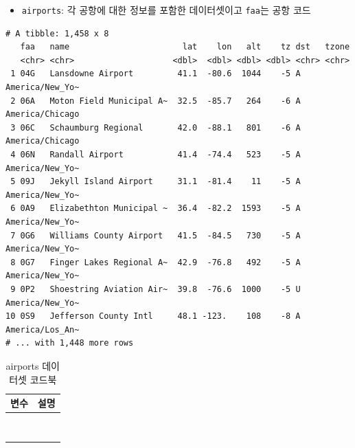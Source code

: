 \documentclass[
  11pt,
]{krantz}
\providecommand{\tightlist}{%
  \setlength{\itemsep}{0pt}\setlength{\parskip}{0pt}}
\begin{document}
\normalsize

\begin{itemize}
\tightlist
\item
  \texttt{airports}: 각 공항에 대한 정보를 포함한 데이터셋이고 \texttt{faa}는 공항 코드
\end{itemize}

\footnotesize

\begin{verbatim}
# A tibble: 1,458 x 8
   faa   name                       lat    lon   alt    tz dst   tzone          
   <chr> <chr>                    <dbl>  <dbl> <dbl> <dbl> <chr> <chr>          
 1 04G   Lansdowne Airport         41.1  -80.6  1044    -5 A     America/New_Yo~
 2 06A   Moton Field Municipal A~  32.5  -85.7   264    -6 A     America/Chicago
 3 06C   Schaumburg Regional       42.0  -88.1   801    -6 A     America/Chicago
 4 06N   Randall Airport           41.4  -74.4   523    -5 A     America/New_Yo~
 5 09J   Jekyll Island Airport     31.1  -81.4    11    -5 A     America/New_Yo~
 6 0A9   Elizabethton Municipal ~  36.4  -82.2  1593    -5 A     America/New_Yo~
 7 0G6   Williams County Airport   41.5  -84.5   730    -5 A     America/New_Yo~
 8 0G7   Finger Lakes Regional A~  42.9  -76.8   492    -5 A     America/New_Yo~
 9 0P2   Shoestring Aviation Air~  39.8  -76.6  1000    -5 U     America/New_Yo~
10 0S9   Jefferson County Intl     48.1 -123.    108    -8 A     America/Los_An~
# ... with 1,448 more rows
\end{verbatim}

\normalsize

\footnotesize

\begin{table}[H]

\caption{\label{tab:unnamed-chunk-49}airports 데이터셋 코드북}
\centering
\fontsize{11}{13}\selectfont
\begin{tabu} to 
\toprule
변수 & 설명\\
\midrule
{}   & \\
 & \\
   & \\
 & \\
   & \\
\addlinespace
{} & \\
   & \\
 & \\
\bottomrule
\end{tabu}
\end{table}
\end{document}
